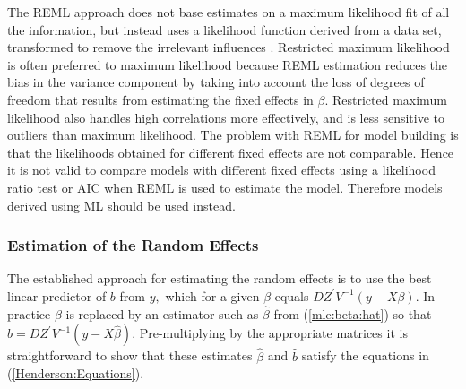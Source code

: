 \documentclass[12pt, a4paper]{report}
\theoremstyle{plain}
\theoremstyle{definition}
\theoremstyle{remark}
\begin{document}
The REML approach does not base estimates on a maximum likelihood fit of all the information, but instead uses a likelihood function derived from a data set, transformed to remove the irrelevant influences \citep{REMLDefine}. Restricted maximum likelihood is often preferred to maximum likelihood because REML estimation reduces the bias in the variance component by taking into account the loss of degrees of freedom that results from estimating the fixed effects in ${\beta}$. Restricted maximum likelihood also handles high correlations more effectively, and is less sensitive to outliers than maximum likelihood.  The problem with REML for model building is that the likelihoods obtained for different fixed effects are not comparable. Hence it is not valid to compare models with different fixed effects using a likelihood ratio test or AIC when REML is used to estimate the model. Therefore models derived using ML should be used instead.

\subsubsection{Estimation of the Random Effects}

The established approach for estimating the random effects is to use the best linear predictor of $b$ from $y,$ which for a given $\beta$ equals $DZ^\prime V^{-1}(y - X \beta).$ In practice $\beta$ is replaced by an estimator such as $\hat{\beta}$ from (\ref{mle:beta:hat}) so that $\hat{b} = DZ^\prime V^{-1}(y - X \hat{\beta}).$ Pre-multiplying by the appropriate matrices it is straightforward to show that these estimates $\hat{\beta}$ and $\hat{b}$ satisfy the equations in (\ref{Henderson:Equations}).
\end{document}
